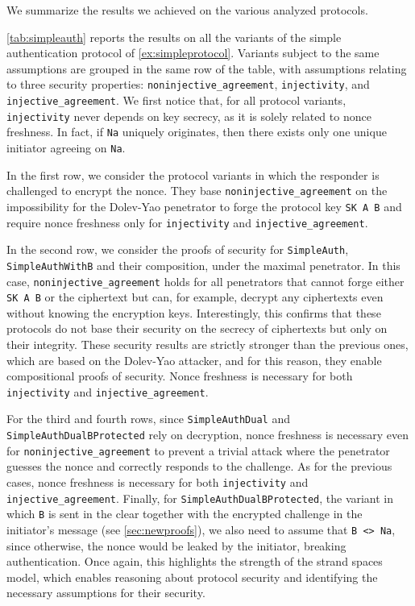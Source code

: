 

We summarize the results we achieved on the various analyzed protocols.

 \cref{tab:simpleauth} reports the results on all the variants of the simple authentication protocol of \cref{ex:simpleprotocol}.
Variants subject to the same assumptions are grouped in the same row  of the table, with assumptions relating to three security properties: \lstinline|noninjective_agreement|, \lstinline|injectivity|, and \lstinline|injective_agreement|. We first notice that, for all protocol variants, \lstinline|injectivity| never depends on key secrecy, as it is solely related to nonce freshness. In fact, if \lstinline|Na| uniquely originates, then there exists only one unique initiator agreeing on \lstinline|Na|.

In the first row, we consider the protocol variants in which the responder is challenged to encrypt the nonce. They base \lstinline|noninjective_agreement| on the impossibility for the Dolev-Yao penetrator to forge the protocol key \lstinline|SK A B| and require nonce freshness only for \lstinline|injectivity| and \lstinline|injective_agreement|.

In the second row, we consider the proofs of security for \lstinline|SimpleAuth|, \lstinline|SimpleAuthWithB| and their composition, under the maximal penetrator. In this case, \lstinline|noninjective_agreement| holds for all penetrators that cannot forge either \lstinline|SK A B| or the ciphertext but can, for example, decrypt any ciphertexts even without knowing the encryption keys. Interestingly, this confirms that these protocols do not base their security on the secrecy of ciphertexts but only on their integrity. These security results are strictly stronger than the previous ones, which are based on the Dolev-Yao attacker, and for this reason, they enable compositional proofs of security. Nonce freshness is necessary for both \lstinline|injectivity| and \lstinline|injective_agreement|.

For the third and fourth rows, since \lstinline|SimpleAuthDual| and \lstinline|SimpleAuthDualBProtected| rely on decryption, nonce freshness is necessary even for \lstinline|noninjective_agreement| to prevent a trivial attack where the penetrator guesses the nonce and correctly responds to the challenge. As for the previous cases, nonce freshness is necessary for both \lstinline|injectivity| and \lstinline|injective_agreement|. Finally, for \lstinline|SimpleAuthDualBProtected|, the variant in which \lstinline|B| is sent in the clear together with the encrypted challenge in the initiator's message (see \cref{sec:newproofs}), we also need to assume that \lstinline|B <> Na|, since otherwise, the nonce would be leaked by the initiator, breaking authentication. Once again, this highlights the strength of the strand spaces model, which enables reasoning about protocol security and identifying the necessary assumptions for their security.



